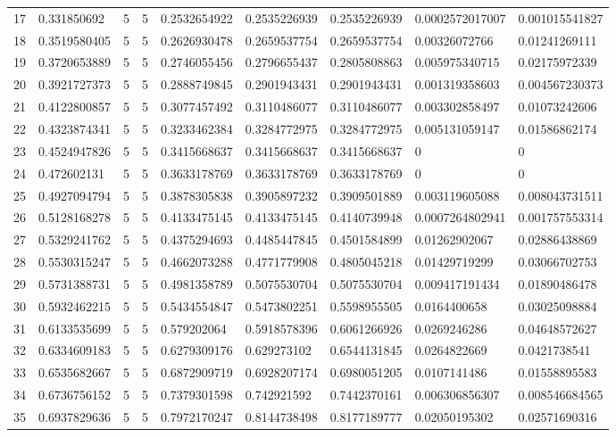\begin{tabular}{@{}lllllllll@{}}
17 & 0.331850692 & 5 & 5 & 0.2532654922 & 0.2535226939 & 0.2535226939 & 0.0002572017007 & 0.001015541827 \\
18 & 0.3519580405 & 5 & 5 & 0.2626930478 & 0.2659537754 & 0.2659537754 & 0.00326072766 & 0.01241269111 \\
19 & 0.3720653889 & 5 & 5 & 0.2746055456 & 0.2796655437 & 0.2805808863 & 0.005975340715 & 0.02175972339 \\
20 & 0.3921727373 & 5 & 5 & 0.2888749845 & 0.2901943431 & 0.2901943431 & 0.001319358603 & 0.004567230373 \\
21 & 0.4122800857 & 5 & 5 & 0.3077457492 & 0.3110486077 & 0.3110486077 & 0.003302858497 & 0.01073242606 \\
22 & 0.4323874341 & 5 & 5 & 0.3233462384 & 0.3284772975 & 0.3284772975 & 0.005131059147 & 0.01586862174 \\
23 & 0.4524947826 & 5 & 5 & 0.3415668637 & 0.3415668637 & 0.3415668637 & 0 & 0 \\
24 & 0.472602131 & 5 & 5 & 0.3633178769 & 0.3633178769 & 0.3633178769 & 0 & 0 \\
25 & 0.4927094794 & 5 & 5 & 0.3878305838 & 0.3905897232 & 0.3909501889 & 0.003119605088 & 0.008043731511 \\
26 & 0.5128168278 & 5 & 5 & 0.4133475145 & 0.4133475145 & 0.4140739948 & 0.0007264802941 & 0.001757553314 \\
27 & 0.5329241762 & 5 & 5 & 0.4375294693 & 0.4485447845 & 0.4501584899 & 0.01262902067 & 0.02886438869 \\
28 & 0.5530315247 & 5 & 5 & 0.4662073288 & 0.4771779908 & 0.4805045218 & 0.01429719299 & 0.03066702753 \\
29 & 0.5731388731 & 5 & 5 & 0.4981358789 & 0.5075530704 & 0.5075530704 & 0.009417191434 & 0.01890486478 \\
30 & 0.5932462215 & 5 & 5 & 0.5434554847 & 0.5473802251 & 0.5598955505 & 0.0164400658 & 0.03025098884 \\
31 & 0.6133535699 & 5 & 5 & 0.579202064 & 0.5918578396 & 0.6061266926 & 0.0269246286 & 0.04648572627 \\
32 & 0.6334609183 & 5 & 5 & 0.6279309176 & 0.629273102 & 0.6544131845 & 0.0264822669 & 0.0421738541 \\
33 & 0.6535682667 & 5 & 5 & 0.6872909719 & 0.6928207174 & 0.6980051205 & 0.0107141486 & 0.01558895583 \\
34 & 0.6736756152 & 5 & 5 & 0.7379301598 & 0.742921592 & 0.7442370161 & 0.006306856307 & 0.008546684565 \\
35 & 0.6937829636 & 5 & 5 & 0.7972170247 & 0.8144738498 & 0.8177189777 & 0.02050195302 & 0.02571690316 \\

\end{tabular}
